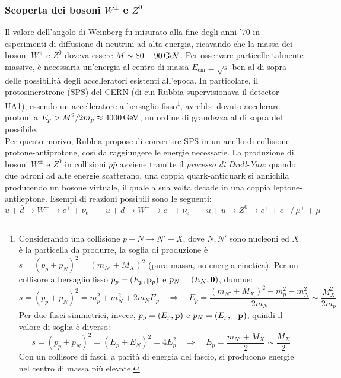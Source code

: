 \subsubsection{Scoperta dei bosoni \texorpdfstring{$ W^{\pm} $}{TEXT} e \texorpdfstring{$ Z^0 $}{TEXT}}

Il valore dell'angolo di Weinberg fu misurato alla fine degli anni '70 in esperimenti di diffusione di neutrini ad alta energia, ricavando che la massa dei bosoni $ W^{\pm} $ e $ Z^0 $ doveva essere $ M \sim 80 - 90 \,\mathrm{GeV} $. Per osservare particelle talmente massive, è necessaria un'energia al centro di massa $ E_{\text{cm}} \equiv \sqrt{s} $ ben al di sopra delle possibilità degli accelleratori esistenti all'epoca. In particolare, il protosincrotrone (SPS) del CERN (di cui Rubbia supervisionava il detector UA1), essendo un accelleratore a bersaglio fisso\footnote{Considerando una collisione $ p + N \rightarrow N' + X $, dove $ N,N' $ sono nucleoni ed $ X $ è la particella da produrre, la soglia di produzione è $ s = (p_p + p_N)^2 = (m_{N'} + M_X)^2 $ (pura massa, no energia cinetica). Per un collisore a bersaglio fisso $ p_p = (E_p,\mathbf{p}_p) $ e $ p_N = (E_N, \mathbf{0}) $, dunque:
\begin{equation*}
	s = (p_p + p_N)^2 = m_p^2 + m_N^2 + 2m_N E_p
	\quad \Rightarrow \quad
	E_p = \frac{(m_{N'} + M_X)^2 - m_p^2 - m_N^2}{2m_N} \sim \frac{M_X^2}{2m_p}
\end{equation*}
Per due fasci simmetrici, invece, $ p_p = (E_p,\mathbf{p}) $ e $ p_{N} = (E_p, -\mathbf{p}) $, quindi il valore di soglia è diverso:
\begin{equation*}
	s = (p_p + p_N)^2 = (E_p + E_N)^2 = 4E_p^2
	\quad \Rightarrow \quad
	E_p = \frac{m_{N'} + M_X}{2} \sim \frac{M_X}{2}
\end{equation*}
Con un collisore di fasci, a parità di energia del fascio, si producono energie nel centro di massa più elevate.}, avrebbe dovuto accelerare protoni a $ E_p > M^2 / 2m_p \approx 4000\,\mathrm{GeV} $, un ordine di grandezza al di sopra del possibile.\\
Per questo morivo, Rubbia propose di convertire SPS in un anello di collisione protone-antiprotone, così da raggiungere le energie necessarie. La produzione di bosoni $ W^{\pm} $ e $ Z^0 $ in collisioni $ p\bar{p} $ avviene tramite il \textit{processo di Drell-Yan}: quando due adroni ad alte energie scatterano, una coppia quark-antiquark si annichila producendo un bosone virtuale, il quale a sua volta decade in una coppia leptone-antileptone. Esempi di reazioni possibili sono le seguenti:
\begin{equation*}
	u + \bar{d} \rightarrow W^+ \rightarrow e^+ + \nu_e
	\qquad
	\bar{u} +  d \rightarrow W^-\rightarrow e^- + \bar{\nu}_e
	\qquad
	u + \bar{u} \rightarrow Z^0 \rightarrow e^+ + e^- \,/\, \mu^+ + \mu^-
\end{equation*}
